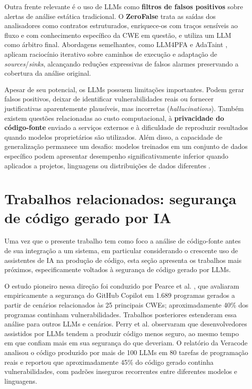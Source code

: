 Outra frente relevante é o uso de LLMs como \textbf{filtros de falsos
positivos} sobre alertas de análise estática tradicional. O
\textbf{ZeroFalse} \cite{yang2025} trata as saídas dos analisadores
como contratos estruturados, enriquece-os com traços sensíveis ao fluxo
e com conhecimento específico da CWE em questão, e utiliza um LLM como
árbitro final. Abordagens semelhantes, como LLM4PFA \cite{wen2025falsealarm}
e AdaTaint \cite{adataint2025}, aplicam raciocínio iterativo sobre
caminhos de execução e adaptação de \textit{sources}/\textit{sinks},
alcançando reduções expressivas de falsos alarmes preservando a
cobertura da análise original.

Apesar de seu potencial, os LLMs possuem limitações importantes. Podem
gerar falsos positivos, deixar de identificar vulnerabilidades reais ou
fornecer justificativas aparentemente plausíveis, mas incorretas
(\textit{hallucinations}). Também existem questões relacionadas ao
custo computacional, à \textbf{privacidade do código-fonte} enviado a
serviços externos e à dificuldade de reproduzir resultados quando
modelos proprietários são utilizados. Além disso, a capacidade de
generalização permanece um desafio: modelos treinados em um conjunto de
dados específico podem apresentar desempenho significativamente inferior
quando aplicados a projetos, linguagens ou distribuições de dados
diferentes \cite{ding2024primevul,outofdistribution2025}.

\newpage 
\section{Trabalhos relacionados: segurança de código gerado por IA}
\label{sec:trabalhos_relacionados}

Uma vez que o presente trabalho tem como foco a análise de código-fonte
antes de sua integração a um sistema, em particular considerando o
crescente uso de assistentes de IA na produção de código, esta seção
apresenta os trabalhos mais próximos, especificamente voltados à
segurança de código gerado por LLMs.

O estudo pioneiro nessa direção foi conduzido por Pearce et al.
\cite{pearce2022copilot}, que avaliaram empiricamente a segurança do
GitHub Copilot em 1.689 programas gerados a partir de cenários
relacionados às 25 principais CWEs; aproximadamente 40\% dos programas
continham vulnerabilidades. Trabalhos posteriores estenderam essa
análise para outros LLMs e cenários. Perry et al. \cite{perry2023users}
observaram que desenvolvedores assistidos por LLMs tendem a produzir
código menos seguro, ao mesmo tempo em que confiam mais em sua
segurança do que deveriam. O relatório da Veracode \cite{veracode2025}
analisou o código produzido por mais de 100 LLMs em 80 tarefas de
programação reais e reportou que aproximadamente 45\% do código gerado
continha vulnerabilidades, com padrões inseguros recorrentes entre
diferentes modelos e linguagens.

